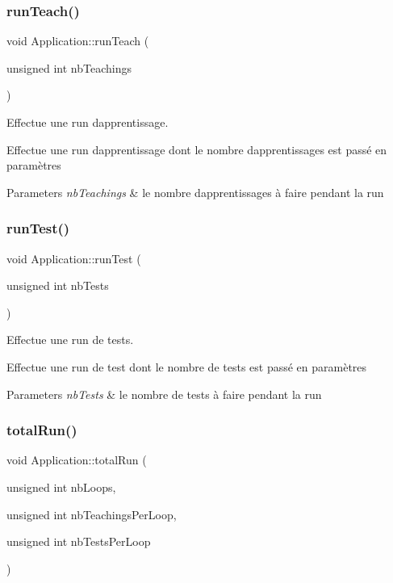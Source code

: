\subsubsection{\texorpdfstring{run\+Teach()}{runTeach()}}
{\footnotesize\ttfamily void Application\+::run\+Teach (\begin{DoxyParamCaption}\item[{unsigned int}]{nb\+Teachings }\end{DoxyParamCaption})}



Effectue une run d\textquotesingle{}apprentissage. 

Effectue une run d\textquotesingle{}apprentissage dont le nombre d\textquotesingle{}apprentissages est passé en paramètres 
\begin{DoxyParams}{Parameters}
{\em nb\+Teachings} & le nombre d\textquotesingle{}apprentissages à faire pendant la run \\
\hline
\end{DoxyParams}
\mbox{\label{classApplication_a2efd3cc253a127ea682a00b560f6d073}} 
\subsubsection{\texorpdfstring{run\+Test()}{runTest()}}
{\footnotesize\ttfamily void Application\+::run\+Test (\begin{DoxyParamCaption}\item[{unsigned int}]{nb\+Tests }\end{DoxyParamCaption})}



Effectue une run de tests. 

Effectue une run de test dont le nombre de tests est passé en paramètres 
\begin{DoxyParams}{Parameters}
{\em nb\+Tests} & le nombre de tests à faire pendant la run \\
\hline
\end{DoxyParams}
\mbox{\label{classApplication_a105d173f14e444ddb485d5ac5df91d74}} 
\subsubsection{\texorpdfstring{total\+Run()}{totalRun()}}
{\footnotesize\ttfamily void Application\+::total\+Run (\begin{DoxyParamCaption}\item[{unsigned int}]{nb\+Loops,  }\item[{unsigned int}]{nb\+Teachings\+Per\+Loop,  }\item[{unsigned int}]{nb\+Tests\+Per\+Loop }\end{DoxyParamCaption})}




